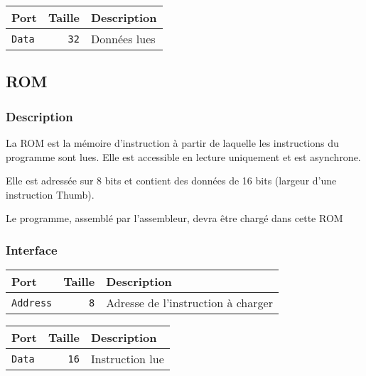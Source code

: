 \documentclass{article}
\begin{document}

    \begin{tabular}{|l|r|l|}
        \hline
        \textbf{Port}   & \textbf{Taille} & \textbf{Description} \\
        \hline
        \texttt{Data} & \texttt{32}     & Données lues         \\

        \hline
    \end{tabular}

    \subsection{ROM}

    \subsubsection{Description}

    La ROM est la mémoire d'instruction à partir de laquelle les instructions du programme sont lues.
    Elle est accessible en lecture uniquement et est asynchrone.

    Elle est adressée sur 8 bits et contient des données de 16 bits (largeur d'une instruction Thumb).

    Le programme, assemblé par l'assembleur, devra être chargé dans cette ROM

    \subsubsection{Interface}


    \begin{tabular}{|l|r|l|}
        \hline
        \textbf{Port}   & \textbf{Taille} & \textbf{Description}               \\
        \hline

        \texttt{Address} & \texttt{8}      & Adresse de l'instruction à charger \\

        \hline
    \end{tabular}


    \begin{tabular}{|l|r|l|}
        \hline
        \textbf{Port}   & \textbf{Taille} & \textbf{Description} \\
        \hline

        \texttt{Data} & \texttt{16}     & Instruction lue      \\

        \hline
    \end{tabular}


\end{document}

